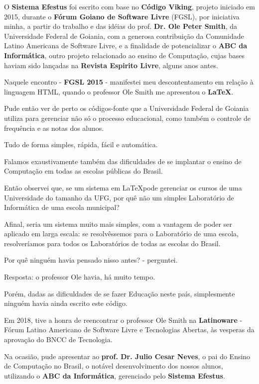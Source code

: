 \begin{multicols}{2}
{
\large
O \textbf{Sistema Efestus} foi escrito com base no \textbf{Código Viking}, projeto iniciado em 2015, durante o \textbf{Fórum \nobreak Goiano de Software Livre} (FGSL), por iniciativa minha, a partir do trabalho e das idéias do prof. \textbf{Dr. Ole Peter Smith}, da Universidade Federal de Goiania, com a generosa contribuição da Comunidade Latino Americana de Software Livre, e a finalidade de potencializar o \textbf{ABC da Informática}, outro projeto relacionado ao ensino de Computação, cujas bases haviam sido lançadas na \textbf{Revista Espirito Livre}, alguns anos antes.

Naquele encontro - \textbf{FGSL 2015} - manifestei meu descontentamento em relação à linguagem HTML, quando o professor Ole Smith me apresentou o \textbf{\LaTeX}.

Pude então ver de perto os códigos-fonte que a Universidade Federal de Goiania utiliza para gerenciar não só o processo educacional, como também o controle de frequência e as notas dos alunos.

Tudo de forma simples, rápida, fácil e automática.

Falamos exaustivamente também das dificuldades de se implantar o ensino de Computação em todas as escolas públicas do Brasil.

Então observei que, se um sistema em \LaTeX\space pode gerenciar os cursos de uma Universidade do tamanho da UFG, por quê não um simples Laboratório de Informática de uma escola municipal? 

Afinal, seria um sistema muito mais simples, com a vantagem de poder ser aplicado em larga escala: se resolvêssemos para o Laboratório de uma escola, resolveríamos para todos os Laboratórios de todas as escolas do Brasil.

Por quê ninguém havia pensado nisso antes? - perguntei.

Resposta: o professor Ole havia, há muito tempo.

Porém, dadas as dificuldades de se fazer Educação neste país, simplesmente ninguém havia ainda escrito este código.

Em 2018, tive a honra de reencontrar o professor Ole Smith na \textbf{Latinoware} - Fórum Latino Americano de Software Livre e Tecnologias Abertas, às vesperas da aprovação do BNCC de Tecnologia.

Na ocasião, pude apresentar ao \textbf{prof. Dr. Julio Cesar Neves}, o pai do Ensino de Computação no Brasil, o notável desenvolvimento dos nossos alunos, utilizando o \textbf{ABC da Informática}, gerenciado pelo \textbf{Sistema Efestus}.

}
\end{multicols}
